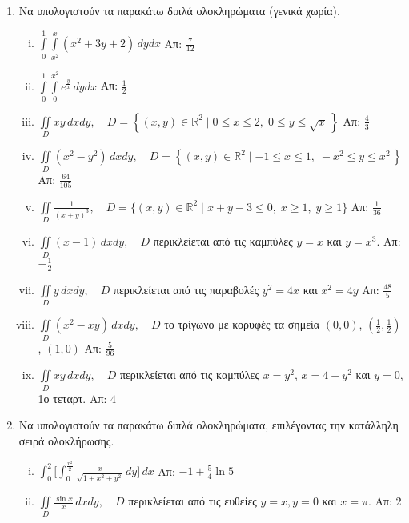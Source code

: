 \begin{enumerate}
  \item Να υπολογιστούν τα παρακάτω διπλά ολοκληρώματα (γενικά χωρία).
    \begin{enumerate}[i)]
      \item $\int\limits_0^1\!\!\int\limits_{x^2}^{x}(x^2+3y+2)\,dydx$ 
        \hfill Απ: $\frac{7}{12}$ %
      \item $\int\limits_0^1\!\!\int\limits_0^{x^2}e^{\frac{y}{x}}\,dydx$
        \hfill Απ: $\frac{1}{2}$ %
      \item $\iint\limits_{D}xy\,dxdy,\quad D=
        \left\{(x,y)\in\mathbb{R}^2\mid 0\leq x\leq 2,\; 0\leq y\leq \sqrt{x}\,\right\}$ 
        \hfill Απ: $\frac{4}{3}$
      \item $\iint\limits_{D}(x^2-y^2)\,dxdy,\quad D=
        \left\{(x,y)\in\mathbb{R}^2 \mid -1\leq x\leq 1,\;-x^2\leq y\leq x^2\,\right\}$  
        \hfill Απ: $ \frac{64}{105}$
      \item $ \iint\limits_{D} \frac{1}{(x+y)^{3}}, \quad 
        D= \{(x,y)\in \mathbb{R}^{2} \mid x+y-3 \leq 0,\; x \geq 1,\; y \geq 1 \}$ 
        \hfill Απ: $ \frac{1}{36} $  
      \item $\iint\limits_{D}(x-1)\,dxdy,\quad D$ περικλείεται από τις καμπύλες 
        $y=x$ και $y=x^3$. %
        \hfill Απ: $-\frac{1}{2}$
      \item $ \iint\limits_{D} y\,dxdy, \quad D $ περικλείεται από τις παραβολές 
        $ y^2=4x $ και $ x^{2}=4y $ 
        \hfill Απ: $ \frac{48}{5} $ %
      \item $ \iint\limits_{D} (x^{2}-xy)\,dxdy, \quad D $ το τρίγωνο με κορυφές τα 
        σημεία $ (0,0) $, $ \left(\frac{1}{2}, \frac{1}{2}\right) $, $ (1,0) $ 
        \hfill Απ: $ \frac{5}{96} $ %
      \item $ \iint\limits_{D} xy\,dxdy, \quad D $ περικλείεται από τις καμπύλες 
        $ x=y^{2} $, $ x=4-y^{2} $ και $ y=0 $, 1ο τεταρτ.
        \hfill Απ: $4$ %

    \end{enumerate}

  \item Να υπολογιστούν τα παρακάτω διπλά ολοκληρώματα, επιλέγοντας την κατάλληλη 
    σειρά ολοκλήρωσης.
    \begin{enumerate}[i)]
      \item $ \int _{0}^{2} \Biggl[\int_{0}^{\frac{x^2}{2}}
          \frac{x}{\sqrt{1+x^{2}+y^{2}}}\,dy\Biggr] \,{dx} $
        \hfill Απ: $-1+\frac{5}{4}\ln 5$ %
      \item $\iint\limits_{D}\frac{\sin x}{x}\,dxdy,\quad D$ περικλείεται από 
        τις ευθείες $y=x, y=0$ και $x=\pi$.  
        \hfill Απ: $2$
    \end{enumerate}


\end{enumerate}
